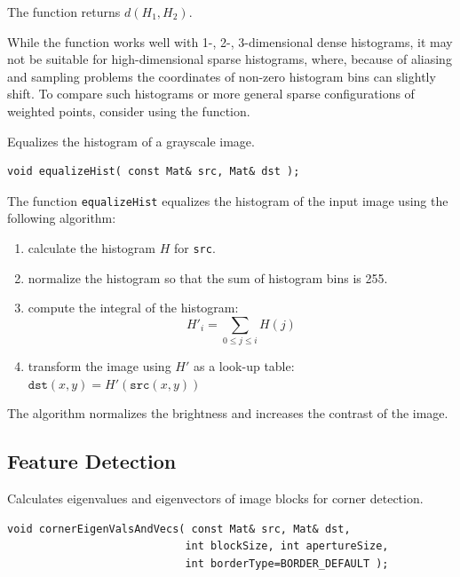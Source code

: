 The function returns $d(H_1, H_2)$.

While the function works well with 1-, 2-, 3-dimensional dense histograms, it may not be suitable for high-dimensional sparse histograms, where, because of aliasing and sampling problems the coordinates of non-zero histogram bins can slightly shift. To compare such histograms or more general sparse configurations of weighted points, consider using the  function.

\label{equalizeHist}
Equalizes the histogram of a grayscale image.

\begin{lstlisting}
void equalizeHist( const Mat& src, Mat& dst );
\end{lstlisting}
\begin{description}
\end{description}

The function \texttt{equalizeHist} equalizes the histogram of the input image using the following algorithm:

\begin{enumerate}
\item calculate the histogram $H$ for \texttt{src}.
\item normalize the histogram so that the sum of histogram bins is 255.
\item compute the integral of the histogram:
\[
H'_i = \sum_{0 \le j \le i} H(j)
\]
\item transform the image using $H'$ as a look-up table: $\texttt{dst}(x,y) = H'(\texttt{src}(x,y))$
\end{enumerate}

The algorithm normalizes the brightness and increases the contrast of the image.


\subsection{Feature Detection}

\label{cornerEigenValsAndVecs}
Calculates eigenvalues and eigenvectors of image blocks for corner detection.

\begin{lstlisting}
void cornerEigenValsAndVecs( const Mat& src, Mat& dst,
                            int blockSize, int apertureSize,
                            int borderType=BORDER_DEFAULT );
\end{lstlisting}
\begin{description}
\end{description}

